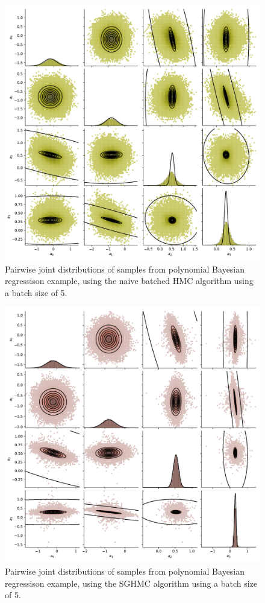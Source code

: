 \begin{figure}[htbp]
    \centering
    \includegraphics[width=\linewidth]{Figures/simulated_pairs_HMC_5.pdf}
    \caption{Pairwise joint distributions of samples from polynomial Bayesian regressison example, using the naive batched HMC algorithm using a batch size of 5.}
    \label{fig:pairs-hmc-5}
\end{figure}
\begin{figure}[htbp]
    \centering
    \includegraphics[width=\linewidth]{Figures/simulated_pairs_SGHMC_5.pdf}
    \caption{Pairwise joint distributions of samples from polynomial Bayesian regressison example, using the SGHMC algorithm using a batch size of 5.}
    \label{fig:pairs-sghmc-5}
\end{figure}

